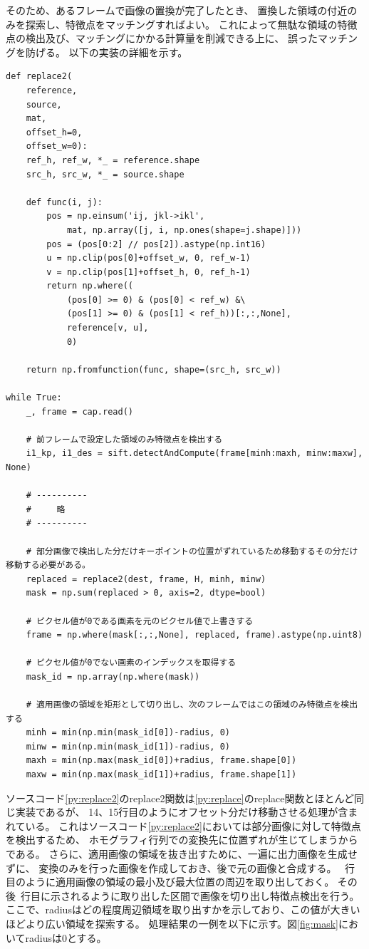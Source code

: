 そのため、あるフレームで画像の置換が完了したとき、
置換した領域の付近のみを探索し、特徴点をマッチングすればよい。
これによって無駄な領域の特徴点の検出及び、マッチングにかかる計算量を削減できる上に、
誤ったマッチングを防げる。
以下の実装の詳細を示す。

\begin{lstlisting}[caption=対応点マッチング, label=py:replace2]
def replace2(
    reference,
    source,
    mat,
    offset_h=0,
    offset_w=0):
    ref_h, ref_w, *_ = reference.shape
    src_h, src_w, *_ = source.shape

    def func(i, j):
        pos = np.einsum('ij, jkl->ikl',
            mat, np.array([j, i, np.ones(shape=j.shape)]))
        pos = (pos[0:2] // pos[2]).astype(np.int16)
        u = np.clip(pos[0]+offset_w, 0, ref_w-1)
        v = np.clip(pos[1]+offset_h, 0, ref_h-1)
        return np.where((
            (pos[0] >= 0) & (pos[0] < ref_w) &\
            (pos[1] >= 0) & (pos[1] < ref_h))[:,:,None],
            reference[v, u],
            0)

    return np.fromfunction(func, shape=(src_h, src_w))

while True:
    _, frame = cap.read()
    
    # 前フレームで設定した領域のみ特徴点を検出する
    i1_kp, i1_des = sift.detectAndCompute(frame[minh:maxh, minw:maxw], None)

    # ----------
    #     略    
    # ----------

    # 部分画像で検出した分だけキーポイントの位置がずれているため移動するその分だけ移動する必要がある。
    replaced = replace2(dest, frame, H, minh, minw)
    mask = np.sum(replaced > 0, axis=2, dtype=bool)

    # ピクセル値が0である画素を元のピクセル値で上書きする
    frame = np.where(mask[:,:,None], replaced, frame).astype(np.uint8)

    # ピクセル値が0でない画素のインデックスを取得する
    mask_id = np.array(np.where(mask))

    # 適用画像の領域を矩形として切り出し、次のフレームではこの領域のみ特徴点を検出する
    minh = min(np.min(mask_id[0])-radius, 0)
    minw = min(np.min(mask_id[1])-radius, 0)
    maxh = min(np.max(mask_id[0])+radius, frame.shape[0])
    maxw = min(np.max(mask_id[1])+radius, frame.shape[1])
\end{lstlisting}

ソースコード\ref{py:replace2}のreplace2関数は\ref{py:replace}のreplace関数とほとんど同じ実装であるが、
14、15行目のようにオフセット分だけ移動させる処理が含まれている。
これはソースコード\ref{py:replace2}においては部分画像に対して特徴点を検出するため、
ホモグラフィ行列での変換先に位置ずれが生じてしまうからである。
さらに、適用画像の領域を抜き出すために、一遍に出力画像を生成せずに、
変換のみを行った画像を作成しておき、後で元の画像と合成する。
~行目のように適用画像の領域の最小及び最大位置の周辺を取り出しておく。
その後~行目に示されるように取り出した区間で画像を切り出し特徴点検出を行う。
ここで、radiusはどの程度周辺領域を取り出すかを示しており、この値が大きいほどより広い領域を探索する。
処理結果の一例を以下に示す。図\ref{fig:mask}においてradiusは0とする。

